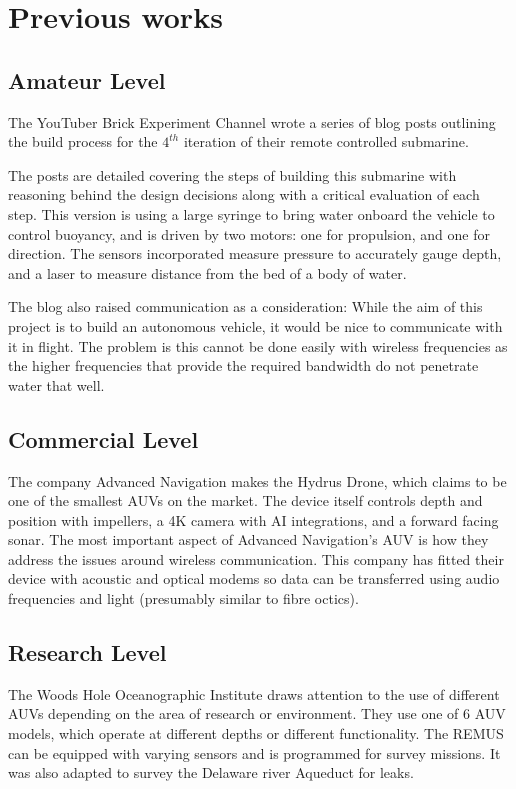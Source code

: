 \documentclass[11pt,a4paper,titlepage]{report}
\begin{document}
	\section*{Previous works}
	\subsection*{Amateur Level}
	The YouTuber Brick Experiment Channel\cite{BRICK_EXPERIMENT_CHANNEL_PROFILE} wrote a series of blog posts\cite{BRICK_EXPERIMENT_CHANNEL_BLOG} outlining the build process for the $4^{th}$ iteration of their remote controlled submarine. 
	
	The posts are detailed covering the steps of building this submarine with reasoning behind the design decisions along with a critical evaluation of each step. This version is using a large syringe to bring water onboard the vehicle to control buoyancy, and is driven by two motors: one for propulsion, and one for direction. The sensors incorporated measure pressure to accurately gauge depth, and a laser to measure distance from the bed of a body of water. 
	
	The blog also raised communication as a consideration: While the aim of this project is to build an autonomous vehicle, it would be nice to communicate with it in flight. The problem is this cannot be done easily with wireless frequencies as the higher frequencies that provide the required bandwidth do not penetrate water that well.
	
	\subsection*{Commercial Level}
	The company Advanced Navigation makes the Hydrus Drone\cite{ADVANCED_NAVIGATION_HYDRUS}, which claims to be one of the smallest AUVs on the market. The device itself controls depth and position with impellers, a 4K camera with AI integrations, and a forward facing sonar. The most important aspect of Advanced Navigation's AUV is how they address the issues around wireless communication. This company has fitted their device with acoustic and optical modems so data can be transferred using audio frequencies and light (presumably similar to fibre octics).
	
	\subsection*{Research Level}
	The Woods Hole Oceanographic Institute\cite{WOODS_HOLE} draws attention to the use of different AUVs depending on the area of research or environment. They use one of 6 AUV models, which operate at different depths or different functionality. The REMUS\cite{WOODS_HOLE_REMUS} can be equipped with varying sensors and is programmed for survey missions. It was also adapted to survey the Delaware river Aqueduct for leaks. 
	
\end{document}
